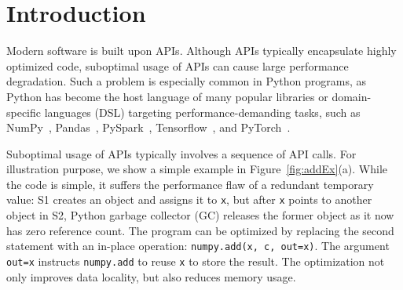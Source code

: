 \documentclass[sigconf]{acmart}\settopmatter{printfolios=true,printccs=false,printacmref=false}\setcopyright{none}
\begin{document}

\maketitle

\section{Introduction}

\label{sec:intro}

Modern software is built upon APIs. Although APIs typically encapsulate highly optimized code, suboptimal usage of APIs can cause large performance degradation. Such a problem is especially common in Python programs, as Python has become the host language of many popular libraries or domain-specific languages (DSL) targeting performance-demanding tasks, such as NumPy~\cite{Walt:2011}, Pandas~\cite{mckinney2011pandas}, PySpark~\cite{Zaharia:2010}, Tensorflow~\cite{abadi2016tensorflow}, and PyTorch~\cite{paszke2017pytorch}.

Suboptimal usage of APIs typically involves a sequence of API calls. For illustration purpose, we show a simple example in Figure~\ref{fig:addEx}(a). While the code is simple, it suffers the performance flaw of a redundant temporary value: S1 creates an object and assigns it to \texttt{x}, but after \texttt{x} points to another object in S2, Python garbage collector (GC) releases the former object as it now has zero reference count. The program can be optimized by replacing the second statement with an in-place operation: \texttt{numpy.add(x, c, out=x)}. The argument \texttt{out=x} instructs \texttt{numpy.add} to reuse \texttt{x} to store the result. The optimization not only improves data locality, but also reduces memory usage. 
\end{document}
